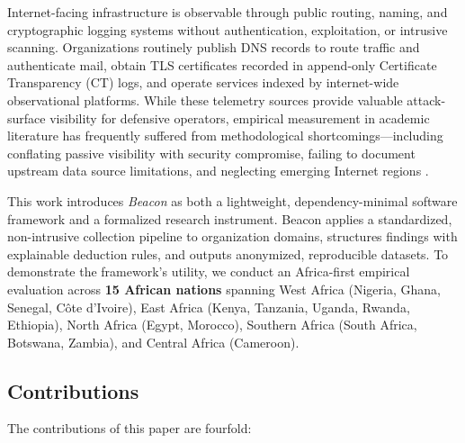 \documentclass[conference]{IEEEtran}
\begin{document}
Internet-facing infrastructure is observable through public routing, naming, and cryptographic logging systems without authentication, exploitation, or intrusive scanning. Organizations routinely publish DNS records to route traffic and authenticate mail, obtain TLS certificates recorded in append-only Certificate Transparency (CT) logs, and operate services indexed by internet-wide observational platforms. While these telemetry sources provide valuable attack-surface visibility for defensive operators, empirical measurement in academic literature has frequently suffered from methodological shortcomings---including conflating passive visibility with security compromise, failing to document upstream data source limitations, and neglecting emerging Internet regions \cite{durumeric2014internet, levchenko2016understanding}.

This work introduces \textit{Beacon} as both a lightweight, dependency-minimal software framework and a formalized research instrument. Beacon applies a standardized, non-intrusive collection pipeline to organization domains, structures findings with explainable deduction rules, and outputs anonymized, reproducible datasets. To demonstrate the framework's utility, we conduct an Africa-first empirical evaluation across \textbf{15 African nations} spanning West Africa (Nigeria, Ghana, Senegal, Côte d'Ivoire), East Africa (Kenya, Tanzania, Uganda, Rwanda, Ethiopia), North Africa (Egypt, Morocco), Southern Africa (South Africa, Botswana, Zambia), and Central Africa (Cameroon).

\subsection*{Contributions}
The contributions of this paper are fourfold:
\end{document}
